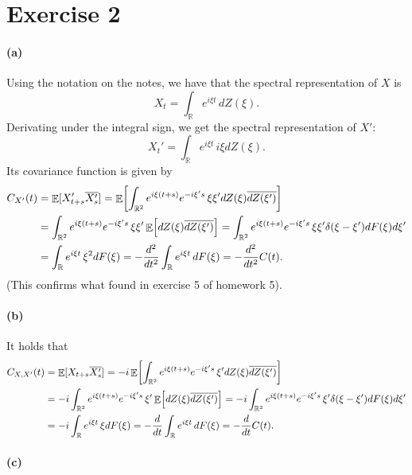 \documentclass[a4paper,11pt]{article}
\theoremstyle{definition}
\theoremstyle{plain}
\theoremstyle{remark}
\DeclarePairedDelimiter{\parq}{[}{]}
\DeclareMathOperator*{\expval}{\mathbb{E}}
\begin{document}
\section*{Exercise 2}

\paragraph*{(a)}

Using the notation on the notes, we have that the spectral representation of $X$ is 
$$
X_t = \int_\mathbb{R} e^{i\xi t}\,dZ(\xi).
$$
Derivating under the integral sign, we get the spectral representation of $X'$:
$$
X_t' = \int_\mathbb{R} e^{i\xi t}\,i\xi dZ(\xi).
$$
Its covariance function is given by
\begin{align*}
C_{X'}(t) & = \expval\parq{X_{t+s}'\overline{X_s'}} = \expval\parq*{\int_{\mathbb{R}^2} e^{i\xi (t+s)}e^{-i\xi's}\,\xi\xi'dZ(\xi)\overline{dZ(\xi')}} \\ & = \int_{\mathbb{R}^2} e^{i\xi (t+s)}e^{-i\xi's}\,\xi\xi'\expval\parq*{dZ(\xi)\overline{dZ(\xi')}} = \int_{\mathbb{R}^2} e^{i\xi (t+s)}e^{-i\xi's}\,\xi\xi'\delta(\xi-\xi')dF(\xi)d\xi' \\ & = \int_\mathbb{R} e^{i\xi t}\,\xi^2 dF(\xi) = -\frac{d^2}{dt^2}\int_\mathbb{R} e^{i\xi t}\,dF(\xi) = -\frac{d^2}{dt^2}C(t).
\end{align*}
(This confirms what found in exercise 5 of homework 5).

\paragraph*{(b)}
 
It holds that
\begin{align*}
C_{X,X'}(t) & = \expval\parq{X_{t+s}\overline{X_s'}} = -i\expval\parq*{\int_{\mathbb{R}^2} e^{i\xi (t+s)}e^{-i\xi's}\,\xi'dZ(\xi)\overline{dZ(\xi')}} \\ & = -i\int_{\mathbb{R}^2} e^{i\xi (t+s)}e^{-i\xi's}\,\xi'\expval\parq*{dZ(\xi)\overline{dZ(\xi')}} = -i\int_{\mathbb{R}^2} e^{i\xi (t+s)}e^{-i\xi's}\,\xi'\delta(\xi-\xi')dF(\xi)d\xi' \\ & = -i\int_\mathbb{R} e^{i\xi t}\,\xi dF(\xi) = -\frac{d}{dt}\int_\mathbb{R} e^{i\xi t}\,dF(\xi) = -\frac{d}{dt}C(t).
\end{align*} 

\paragraph*{(c)}
\end{document}
